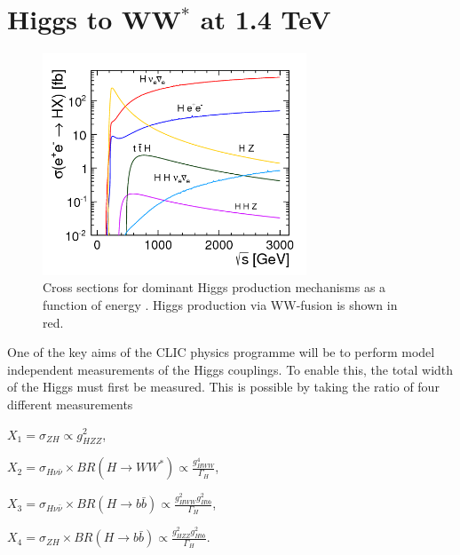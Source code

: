 \chapter{Higgs to WW$^*$ at 1.4 TeV}
\label{Higgs Analysis}

\begin{figure}
  \centering
  \includegraphics[width=0.7\textwidth,keepaspectratio]{Theory/fig/HiggsCrossSections}
  \caption[Cross Sections For Higgs Production Mechanisms]{Cross sections for dominant Higgs production mechanisms as a function of energy \cite{Abramowicz:2016zbo}. Higgs production via WW-fusion is shown in red.}
  \label{fig:higgsXSecs2}
\end{figure}

One of the key aims of the \ac{CLIC} physics programme will be to perform model independent measurements of the Higgs couplings. To enable this, the total width of the Higgs must first be measured. This is possible\cite{Durig:2014lfa} by taking the ratio of four different measurements


\hspace{120pt}  $X_1=\sigma_{ZH} \propto g_{HZZ}^2$,

\hspace{120pt}   $X_2=\sigma_{H\nu\bar{\nu}} \times BR(H\rightarrow WW^*) \propto \frac{g_{HWW}^4}{\Gamma_H}$,

\hspace{120pt}   $X_3=\sigma_{H\nu\bar{\nu}} \times BR(H\rightarrow b\bar{b}) \propto \frac{g_{HWW}^{2}g_{Hbb}^2}{\Gamma_H}$,

\hspace{120pt}   $X_4=\sigma_{ZH} \times BR(H\rightarrow b\bar{b}) \propto \frac{g_{HZZ}^{2}g_{Hbb}^2}{\Gamma_H}$.


